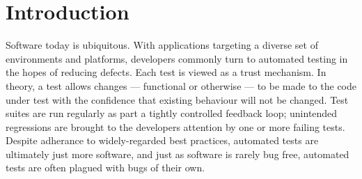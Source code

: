 \section{Introduction}
\label{sec:intro}



Software today is ubiquitous. With applications targeting a diverse set of environments and platforms, developers commonly turn to automated testing in the hopes of reducing defects. Each test is viewed as a trust mechanism. In theory, a test allows changes --- functional or otherwise --- to be made to the code under test with the confidence that existing behaviour will not be changed. Test suites are run regularly as part a tightly controlled feedback loop; unintended regressions are brought to the developers attention by one or more failing tests. Despite adherance to widely-regarded best practices, automated tests are ultimately just more software, and just as software is rarely bug free, automated tests are often plagued with bugs of their own.

